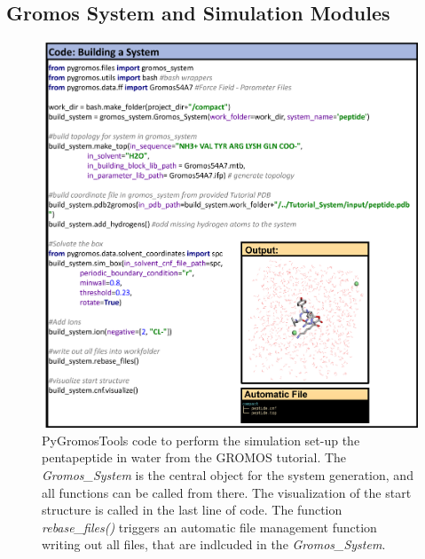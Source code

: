 \subsection{Gromos System and Simulation Modules}
\begin{figure}[h!]
    \centering
    \includegraphics[width=\textwidth]{fig/ApplicationExamples/codeExample_GROMOSSystemSolvBoxTut.png}
    \caption{PyGromosTools code to perform the simulation set-up the pentapeptide in water from the GROMOS tutorial\cite{Lier2020}. The \textit{Gromos\_System} is the central object for the system generation, and all functions can be called from there. The visualization of the start structure is called in the last line of code. The function \textit{rebase\_files()} triggers an automatic file management function writing out all files, that are indlcuded in the \textit{Gromos\_System}.}
    \label{fig: GROMOSSystemExample}
\end{figure}


